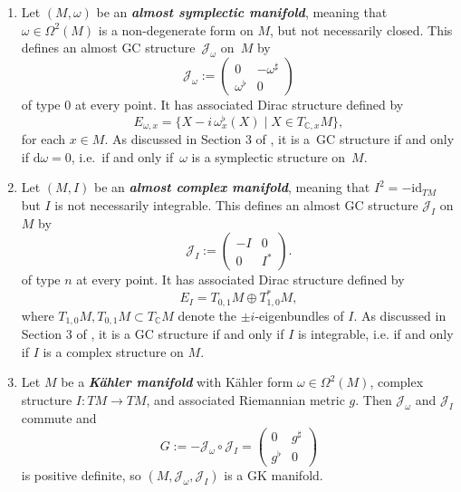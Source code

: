 \documentclass[pdftex]{sigma}
\numberwithin{equation}{section}
\newcommand{\deff}[1]{\textbf{\emph{#1}}}
\newcommand{\func}[3]{#1 \colon #2 \to #3}
\newcommand{\tang}{T}
\begin{document}
\begin{Example} \label{example4} \qquad
\begin{enumerate}\itemsep=0pt
\item Let $(M,\omega)$ be an \deff{almost symplectic manifold}, meaning that $\omega \in \Omega^2(M)$ is a non-degenerate form on $M$, but not necessarily closed.  This def\/ines an almost GC structure~$\mathcal{J}_{\omega}$ on~$M$ by
\[
  \mathcal{J}_{\omega} :=
  \begin{pmatrix}
    0 & - \omega^{\sharp} \\
    \omega^{\flat} & 0
  \end{pmatrix}
\] of type $0$ at every point.
It has associated Dirac structure def\/ined by
\[
  E_{\omega, x}
  =
  \{ X - i \, \omega^{\flat}_x(X)
  \mid X \in \tang_{\mathbb{C}, x} M \},
\]
for each $x \in M$.  As discussed in Section 3 of \cite{gualtieri}, it is a~GC structure if and only if $\mathrm{d} \omega = 0$, i.e.\ if and only if~$\omega$ is a symplectic structure on~$M$.

\item Let $(M,I)$ be an \deff{almost complex manifold}, meaning that $I^2 = -\mathrm{id}_{\tang M}$ but $I$ is not necessarily integrable.  This def\/ines an almost GC structure $\mathcal{J}_{I}$ on $M$ by
\[
  \mathcal{J}_{I}
  :=
  \begin{pmatrix}
  -I & 0 \\
  0 & I^*
  \end{pmatrix}.
\]
of type $n$ at every point.  It has associated Dirac structure def\/ined by
\[
  E_{I}
  = \tang_{0,1} M \oplus \tang_{1,0}^* M,
\]
where $\tang_{1,0} M, \tang_{0,1} M \subset \tang_{\mathbb{C}} M$ denote the $\pm i$-eigenbundles of $I$.
 As discussed in Section 3 of \cite{gualtieri}, it is a GC structure if and only if $I$ is integrable, i.e. if and only if $I$ is a complex structure on $M$.

\item Let $M$ be a \deff{K\"ahler manifold} with K\"ahler form $\omega \in \Omega^2(M)$, complex structure $\func{I}{\tang M}{\tang M}$, and associated Riemannian metric $g$.  Then $\mathcal{J}_\omega$ and $\mathcal{J}_I$ commute and
\[
  G:=-\mathcal{J}_{\omega} \circ \mathcal{J}_I
  = \begin{pmatrix} 0 & g^{\sharp} \\ g^{\flat} & 0 \end{pmatrix}
\]
is positive def\/inite, so $(M, \mathcal{J}_{\omega}, \mathcal{J}_I)$ is a GK manifold.
\end{enumerate}
\end{Example}
\end{document}
